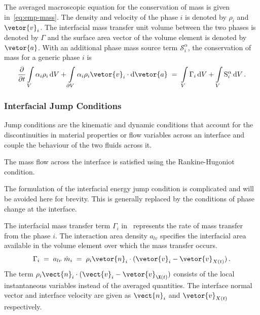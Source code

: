 The averaged macroscopic equation for the conservation of mass is given in~\eqref{eq:emp-mass}.
 The density and velocity of the phase $i$ is denoted by $\rho_{i}$ and $\vetor{v}_{i}$.
 The interfacial mass transfer unit volume between the two phases is denoted
 by $\Gamma$ and the surface area vector of the 
 volume element is denoted by $\vetor{a}$. With an additional phase mass source term $\mathcal{S}_{i}^{\alpha}$,
 the conservation of mass for a generic phase $i$ is 
 \begin{equation}\label{eq:emp-mass}
\frac{\partial}{\partial t}
\int\limits_{V} \alpha_{i} \rho_{i} \,\mathrm{d}V
+ \int\limits_{\partial V} \alpha_{i} \rho_{i} \vetor{v}_{i} \cdot \mathrm{d}\vetor{a}\;=\;
\int\limits_{V} \Gamma_{i} \,\mathrm{d}V
+ \int\limits_{V} \mathrm{S}^{\alpha}_{i} \,\mathrm{d}V\,.
\end{equation}

\subsubsection{Interfacial Jump Conditions}
Jump conditions are the kinematic and dynamic conditions that 
account for the discontinuities in material properties 
or flow variables across an interface and couple the behaviour of the two 
fluids across it. 

The mass flow across the interface is satisfied using the Rankine-Hugoniot condition. 



The formulation of the interfacial energy jump condition is complicated
and will be avoided here for brevity. This is generally replaced by 
the conditions of phase change at the interface.


The interfacial mass transfer term $\Gamma_{i}$ in~
 represents the rate of mass transfer from the phase $i$. The interaction area density $a_{lv}$ specifies 
 the interfacial area available in the volume element over which the mass transfer occurs.
\begin{equation}
 \Gamma_{i}\;=\;a_{lv}\;\dot{m}_{i}\;=\; \rho_{i} \vetor{n}_{i} \cdot (\vetor{v}_{i} - \vetor{v}_{X(t)})\,.
\end{equation}
The term $\rho_{i} \vect{n}_{i} \cdot (\vect{v}_{i} - \vetor{v}_{\X(t)})$ consists of the local instantaneous 
 variables instead of the averaged quantities. The interface normal vector and interface 
 velocity are given as $\vect{n}_{i}$ and $\vetor{v}_{X(t)}$ respectively. 

